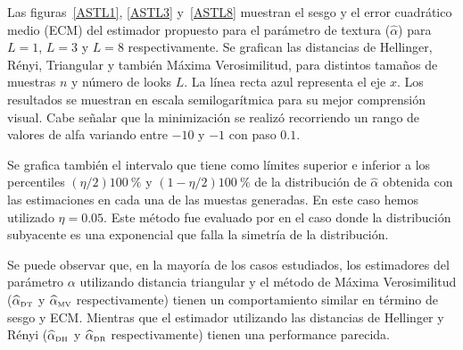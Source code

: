 Las figuras~\ref{ASTL1}, \ref{ASTL3} y~\ref{ASTL8} muestran el sesgo y el error cuadrático medio (ECM) del estimador propuesto para el parámetro de textura ($\widehat{\alpha}$) para $L=1$, $L=3$ y $L=8$ respectivamente. Se grafican las distancias de Hellinger, Rényi, Triangular y también Máxima Verosimilitud, para distintos tamaños de muestras $n$ y número de looks $L$. 
La línea recta azul representa el eje $x$. Los resultados se muestran en escala semilogarítmica para su mejor comprensión visual.
Cabe señalar que la minimización se realizó recorriendo un rango de valores de alfa variando entre $-10$ y $-1$ con paso  $0.1$. 



Se grafica también el intervalo que tiene como límites superior e inferior a los percentiles $(\eta/2)\SI{100}{\percent}$ y $(1-\eta/2)\SI{100}{\percent}$ de la distribución de $\widehat{\alpha}$ obtenida con las estimaciones en cada una de las muestas generadas. En este caso hemos utilizado $\eta=0.05$. Este método fue evaluado por \citet{Buckland1983} en el caso donde la distribución subyacente es una exponencial que falla la simetría de la distribución. 

Se puede observar que, en la mayoría de los casos estudiados, los estimadores del parámetro $\alpha$ utilizando distancia triangular y el método de Máxima Verosimilitud ($\widehat{\alpha}_{\text{\tiny{DT}}}$ y $\widehat{\alpha}_{\text{\tiny{MV}}}$ respectivamente) tienen un comportamiento similar en término de sesgo y ECM. Mientras que  el estimador utilizando las distancias de Hellinger y Rényi ($\widehat{\alpha}_{\text{\tiny{DH}}}$ y $\widehat{\alpha}_{\text{\tiny{DR}}}$ respectivamente) tienen una performance parecida. 

